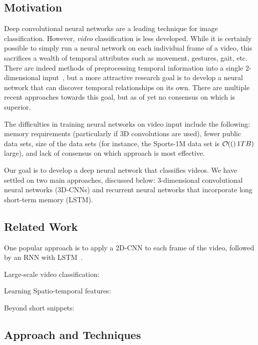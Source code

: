\subsection*{Motivation}
Deep convolutional neural networks are a leading technique for image classification.
However, \emph{video} classification is less developed.
While it is certainly possible to simply run a neural network on each individual frame of a video, this sacrifices a wealth of temporal attributes such as movement, gestures, gait, etc.
There are indeed methods of preprocessing temporal information into a single 2-dimensional input~\cite{brox}, but a more attractive research goal is to develop a neural network that can discover temporal relationships on its own.
There are multiple recent approaches towards this goal, but as of yet no consensus on which is superior.

The difficulties in training neural networks on video input include the following: memory requirements (particularly if 3D convolutions are used), fewer public data sets, size of the data sets (for instance, the Sports-1M data set is $\mathcal{O}\hspace{-.2em}\left({(}\right)1TB)$ large), and lack of consensus on which approach is most effective. 

Our goal is to develop a deep neural network that classifies videos.
We have settled on two main approaches, discussed below: 3-dimensional convolutional neural networks (3D-CNNs) and recurrent neural networks that incorporate long short-term memory (LSTM).  

\subsection*{Related Work}

One popular approach is to apply a 2D-CNN to each frame of the video, followed by an RNN with LSTM~\cite{ltrcn}. 


Large-scale video classification:~\cite{cnnvid}

Learning Spatio-temporal features:~\cite{stf}

Beyond short snippets:~\cite{snip}
\subsection*{Approach and Techniques}

